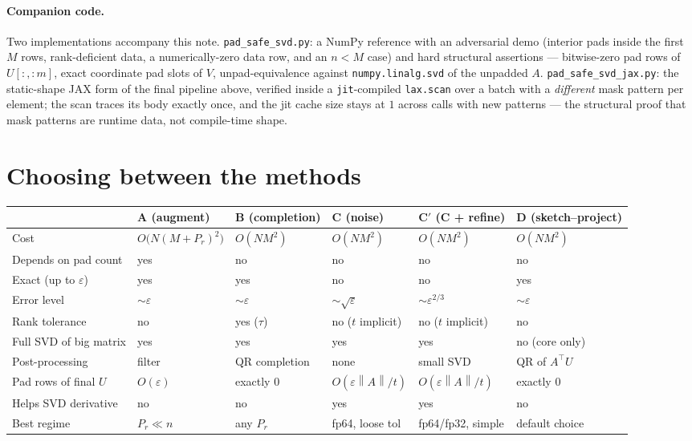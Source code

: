 \documentclass[11pt]{article}
\newcommand{\norm}[1]{\left\lVert #1 \right\rVert}
\begin{document}
\paragraph{Companion code.} Two implementations accompany this note.
\texttt{pad\_safe\_svd.py}: a NumPy reference with an adversarial demo
(interior pads inside the first $M$ rows, rank-deficient data, a
numerically-zero data row, and an $n < M$ case) and hard structural
assertions --- bitwise-zero pad rows of $U[:, :m]$, exact coordinate pad
slots of $V$, unpad-equivalence against \texttt{numpy.linalg.svd} of the
unpadded $A$. \texttt{pad\_safe\_svd\_jax.py}: the static-shape JAX form of
the final pipeline above, verified inside a \texttt{jit}-compiled
\texttt{lax.scan} over a batch with a \emph{different} mask pattern per
element; the scan traces its body exactly once, and the jit cache size stays
at $1$ across calls with new patterns --- the structural proof that mask
patterns are runtime data, not compile-time shape.

\section{Choosing between the methods}

\begin{center}
\footnotesize
\setlength{\tabcolsep}{4pt}
\begin{tabular}{@{}llllll@{}}
\toprule
 & A (augment) & B (completion) & C (noise) & C$'$ (C + refine) & D (sketch--project) \\
\midrule
Cost & $O\!\big(N(M{+}P_r)^2\big)$ & $O(NM^2)$ & $O(NM^2)$ & $O(NM^2)$ & $O(NM^2)$ \\
Depends on pad count & yes & no & no & no & no \\
Exact (up to $\varepsilon$) & yes & yes & no & no & yes \\
Error level & $\sim\varepsilon$ & $\sim\varepsilon$ & $\sim\sqrt{\varepsilon}$ & $\sim\varepsilon^{2/3}$ & $\sim\varepsilon$ \\
Rank tolerance & no & yes ($\tau$) & no ($t$ implicit) & no ($t$ implicit) & no \\
Full SVD of big matrix & yes & yes & yes & yes & no (core only) \\
Post-processing & filter & QR completion & none & small SVD & QR of $A^{\top}U$ \\
Pad rows of final $U$ & $O(\varepsilon)$ & exactly $0$ & $O(\varepsilon\norm{A}/t)$ & $O(\varepsilon\norm{A}/t)$ & exactly $0$ \\
Helps SVD derivative & no & no & yes & yes & no \\
Best regime & $P_r \ll n$ & any $P_r$ & fp64, loose tol & fp64/fp32, simple & default choice \\
\bottomrule
\end{tabular}
\end{center}
\end{document}
